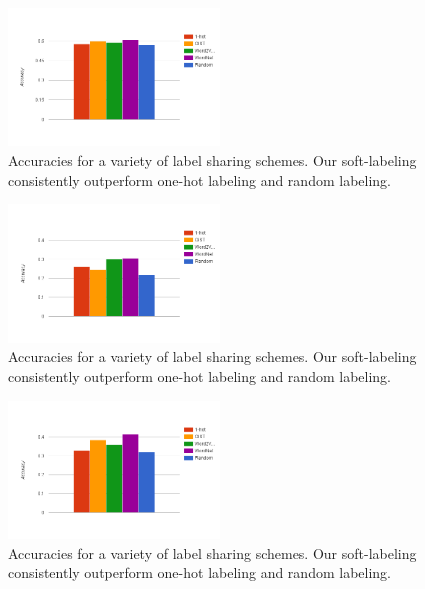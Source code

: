 \begin{figure}[!tb]
  \centering
  \includegraphics[width=0.5\textwidth]{figs/5_1-train_1260.png}
  \caption{
      Accuracies for a variety of label sharing schemes. Our soft-labeling
      consistently outperform one-hot labeling and random labeling.
  }
  \label{fig:5_1-train_100}
\end{figure}

\begin{figure}[!tb]
  \centering
  \includegraphics[width=0.5\textwidth]{figs/10_1-train_100.png}
  \caption{
      Accuracies for a variety of label sharing schemes. Our soft-labeling
      consistently outperform one-hot labeling and random labeling.
  }
  \label{fig:10_1-train_100}
\end{figure}

\begin{figure}[!tb]
  \centering
  \includegraphics[width=0.5\textwidth]{figs/10_1-train_1260.png}
  \caption{
      Accuracies for a variety of label sharing schemes. Our soft-labeling
      consistently outperform one-hot labeling and random labeling.
  }
  \label{fig:10_1-train_100}
\end{figure}

